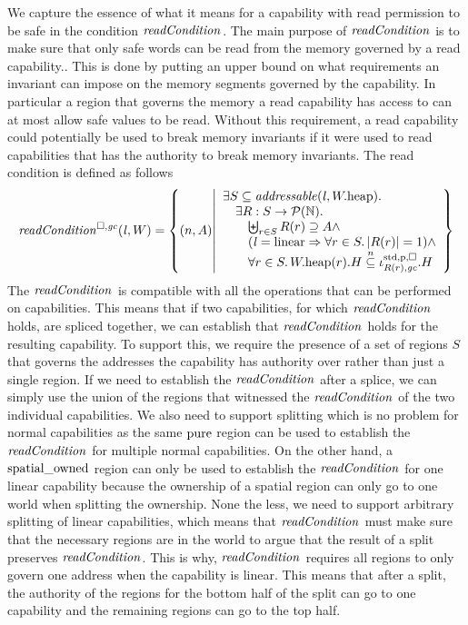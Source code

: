 \begin{jversion}
We capture the essence of what it means for a capability with read permission to be safe in the condition $\readCond[]{}$.
The main purpose of $\readCond[]{}$ is to make sure that only safe words can be read from the memory governed by a read capability..
This is done by putting an upper bound on what requirements an invariant can impose on the memory segments governed by the capability.
In particular a region that governs the memory a read capability has access to can at most allow safe values to be read.
Without this requirement, a read capability could potentially be used to break memory invariants if it were used to read capabilities that has the authority to break memory invariants.
The read condition is defined as follows
\[
  \readCond{\lin,W} = \left\{ \npair{A} \middle| 
    \begin{array}{l}
      \exists S \subseteq \addressable{\lin, \pwheap} \ldotp \\
      \quad \exists R : S \fun \powerset{\nats} \ldotp\\
      \qquad \biguplus_{r\in S} R(r) \supseteq A \wedge\\
      \qquad (\lin = \linear \Rightarrow \forall r \in S \ldotp |R(r)|  = 1) \wedge\\
      \qquad \forall r \in S \ldotp \pwheap(r).H \nsubeq \stdreg{R(r),\gc}{\pur}.H
    \end{array}
  \right\}
\]
The $\readCond[]{}$ is compatible with all the operations that can be performed on capabilities.
This means that if two capabilities, for which $\readCond[]{}$ holds, are spliced together, we can establish that $\readCond[]{}$ holds for the resulting capability.
To support this, we require the presence of a set of regions $S$ that governs the addresses the capability has authority over rather than just a single region.
If we need to establish the $\readCond[]{}$ after a splice, we can simply use the union of the regions that witnessed the $\readCond[]{}$ of the two individual capabilities.
We also need to support splitting which is no problem for normal capabilities as the same $\mathrm{pure}$ region can be used to establish the $\readCond[]{}$ for multiple normal capabilities.
On the other hand, a $\mathrm{spatial\_owned}$ region can only be used to establish the $\readCond[]{}$ for one linear capability because the ownership of a spatial region can only go to one world when splitting the ownership.
None the less, we need to support arbitrary splitting of linear capabilities, which means that $\readCond[]{}$ must make sure that the necessary regions are in the world to argue that the result of a split preserves $\readCond[]{}$.
This is why, $\readCond[]{}$ requires all regions to only govern one address when the capability is linear.
This means that after a split, the authority of the regions for the bottom half of the split can go to one capability and the remaining regions can go to the top half.


\end{jversion}
